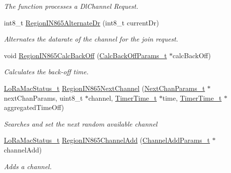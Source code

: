 \begin{DoxyCompactItemize}
\begin{DoxyCompactList}\small\item\em The function processes a Dl\+Channel Request. \end{DoxyCompactList}\item 
int8\+\_\+t \mbox{\hyperlink{group___r_e_g_i_o_n_i_n865_ga72329572c10b8a2ad861af70bccff193}{Region\+I\+N865\+Alternate\+Dr}} (int8\+\_\+t current\+Dr)
\begin{DoxyCompactList}\small\item\em Alternates the datarate of the channel for the join request. \end{DoxyCompactList}\item 
void \mbox{\hyperlink{group___r_e_g_i_o_n_i_n865_ga3227ad7396d15635880bcfe112f57295}{Region\+I\+N865\+Calc\+Back\+Off}} (\mbox{\hyperlink{group___r_e_g_i_o_n_ga7c5c9a8da174e6679eded8257dc92fd9}{Calc\+Back\+Off\+Params\+\_\+t}} $\ast$calc\+Back\+Off)
\begin{DoxyCompactList}\small\item\em Calculates the back-\/off time. \end{DoxyCompactList}\item 
\mbox{\hyperlink{group___l_o_r_a_m_a_c_ga30bd25657e10480f8605ee951b0ecfbd}{Lo\+Ra\+Mac\+Status\+\_\+t}} \mbox{\hyperlink{group___r_e_g_i_o_n_i_n865_gadcfb6edfa248a6057bf179599f81201a}{Region\+I\+N865\+Next\+Channel}} (\mbox{\hyperlink{group___r_e_g_i_o_n_ga115f5e83afae352c0a3dcdc193374040}{Next\+Chan\+Params\+\_\+t}} $\ast$next\+Chan\+Params, uint8\+\_\+t $\ast$channel, \mbox{\hyperlink{utilities_8h_a4215ca43d3e953099ea758ce428599d0}{Timer\+Time\+\_\+t}} $\ast$time, \mbox{\hyperlink{utilities_8h_a4215ca43d3e953099ea758ce428599d0}{Timer\+Time\+\_\+t}} $\ast$aggregated\+Time\+Off)
\begin{DoxyCompactList}\small\item\em Searches and set the next random available channel \end{DoxyCompactList}\item 
\mbox{\hyperlink{group___l_o_r_a_m_a_c_ga30bd25657e10480f8605ee951b0ecfbd}{Lo\+Ra\+Mac\+Status\+\_\+t}} \mbox{\hyperlink{group___r_e_g_i_o_n_i_n865_ga409780ea153146450bde780493f00b1b}{Region\+I\+N865\+Channel\+Add}} (\mbox{\hyperlink{group___r_e_g_i_o_n_gab1c5f3aa06614283202906cef4417860}{Channel\+Add\+Params\+\_\+t}} $\ast$channel\+Add)
\begin{DoxyCompactList}\small\item\em Adds a channel. \end{DoxyCompactList}\item 

\end{DoxyCompactItemize}
